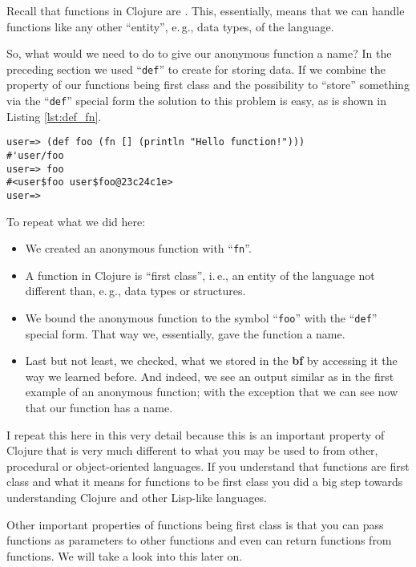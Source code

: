 Recall that functions in Clojure are .
This, essentially, means that we can handle functions like any other ``entity'', e.\,g., data types, of the language.

So, what would we need to do to give our anonymous function a name?
In the preceding section we used ``\texttt{def}'' to create  for storing data.
If we combine the property of our functions being first class and the possibility to ``store'' something via the ``\texttt{def}'' special form the solution to this problem is easy, as is shown in Listing \vref{lst:def_fn}.

\begin{lstlisting}[label=lst:def_fn, caption=Use \texttt{def} and \texttt{fn} to Give a Function a Name]
user=> (def foo (fn [] (println "Hello function!")))
#'user/foo
user=> foo
#<user$foo user$foo@23c24c1e>
user=> 
\end{lstlisting}

To repeat what we did here:
\begin{itemize}
  \item We created an anonymous function with ``\texttt{fn}''.
  \item A function in Clojure is ``first class'', i.\,e., an entity of the language not different than, e.\,g., data types or structures.
  \item We bound the anonymous function to the symbol ``\texttt{foo}'' with the ``\texttt{def}'' special form. 
    That way we, essentially, gave the function a name.
  \item Last but not least, we checked, what we stored in the \textbf{bf} by accessing it the way we learned before.
    And indeed, we see an output similar as in the first example of an anonymous function;
    with the exception that we can see now that our function has a name.
\end{itemize}
I repeat this here in this very detail because this is an important property of Clojure that is very much different to what you may be used to from other, procedural or object-oriented languages.
If you understand that functions are first class and what it means for functions to be first class you did a big step towards understanding Clojure and other Lisp-like languages.

Other important properties of functions being first class is that you can pass functions as parameters to other functions and even can return functions from functions.
We will take a look into this later on.

